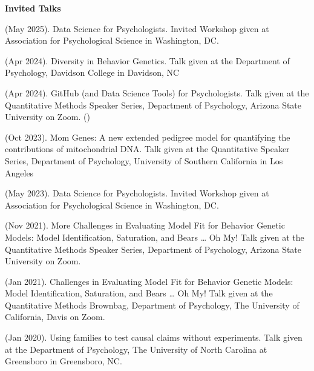 {\large {\bf Invited Talks}}\begin{etaremune}
\item\meb (May 2025). Data Science for Psychologists. Invited Workshop given at Association for Psychological Science in Washington, DC.

\item\meb (Apr 2024). Diversity in Behavior Genetics. Talk given at the Department of Psychology, Davidson College in Davidson, NC 
%
\item\meb (Apr 2024). GitHub (and Data Science Tools) for Psychologists. Talk given at the Quantitative Methods Speaker Series, Department of Psychology, Arizona State University on Zoom. ()
%
\item\meb (Oct 2023). Mom Genes: A new extended pedigree model for quantifying the contributions of mitochondrial DNA. Talk given at the Quantitative Speaker Series, Department of Psychology, University of Southern California in Los Angeles
\item\meb (May 2023). Data Science for Psychologists. Invited Workshop given at Association for Psychological Science in Washington, DC.
\item\meb (Nov 2021). More Challenges in Evaluating Model Fit for Behavior Genetic Models: Model Identification, Saturation, and Bears … Oh My! Talk given at the Quantitative Methods Speaker Series, Department of Psychology, Arizona State University on Zoom.
%
\item\meb (Jan 2021). Challenges in Evaluating Model Fit for Behavior Genetic Models: Model Identification, Saturation, and Bears … Oh My! Talk given at the Quantitative Methods Brownbag, Department of Psychology, The University of California, Davis on Zoom.
%
\item\meb (Jan 2020). Using families to test causal claims without experiments. Talk given at the Department of Psychology, The University of North Carolina at Greensboro in Greensboro, NC.
%

\end{etaremune}

